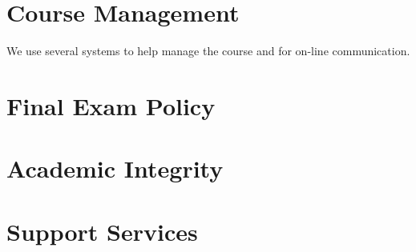 \documentclass[11pt]{article}
\begin{document}


\section{Course Management}

We use several systems to help manage the course
and for on-line communication.





\section{Final Exam Policy}



\section{Academic Integrity}



\section{Support Services}



\lastupdated
\end{document}
